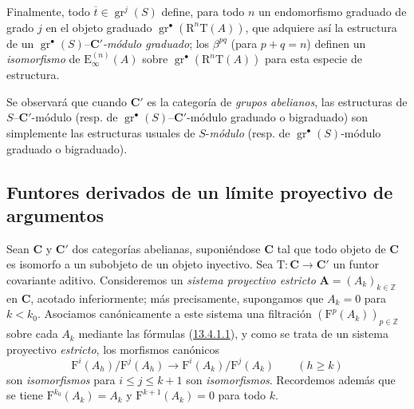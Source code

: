 \begin{env}[13.6.6]
Finalmente, todo $\overline t\in\operatorname{gr}^j(S)$ define, para todo
$n$ un endomorfismo graduado de grado $j$ en el objeto graduado $\operatorname{gr}^\bullet(\mathrm R^n\mathrm T(A))$, que adquiere así la
estructura de un
$\operatorname{gr}^\bullet(S)$--\emph{$\boldsymbol{C}'$-módulo graduado}; los $\beta^{pq}$ (para $p+q=n$) definen un \emph{isomorfismo} de $\mathrm E_\infty^{(n)}(A)$ sobre $\operatorname{gr}^\bullet(\mathrm R^n\mathrm T(A))$ para esta especie de estructura.

Se observará que cuando $\boldsymbol{C}'$ es la categoría de \emph{grupos abelianos}, las
estructuras de $S$--$\boldsymbol{C}'$-módulo (resp. de
$\operatorname{gr}^\bullet(S)$--$\boldsymbol{C}'$-módulo graduado o bigraduado) son
simplemente las estructuras usuales de $S$-\emph{módulo} (resp. de
$\operatorname{gr}^\bullet(S)$-módulo graduado o bigraduado).
\end{env}

\subsection{Funtores derivados de un límite proyectivo de argumentos}
\label{subsection:0.13.7}
\label{subsection:0.13.7-fr}
\label{0.13.7}

\begin{env}[13.7.1]
\label{0.13.7.1}
\label{0.13.7.1-fr}
Sean $\boldsymbol{C}$ y $\boldsymbol{C}'$ dos categorías abelianas, suponiéndose $\boldsymbol{C}$ tal que todo objeto de $\boldsymbol{C}$ es isomorfo a un subobjeto de un
objeto inyectivo.
Sea
$\mathrm T:\boldsymbol{C}\to \boldsymbol{C}'$
un funtor covariante aditivo.
Consideremos un \emph{sistema proyectivo estricto}
$\mathbf A=(A_k)_{k\in\mathbb Z}$ en $\boldsymbol{C}$, acotado inferiormente; más
precisamente, supongamos que $A_k=0$ para $k<k_0$. Asociamos canónicamente a este sistema una filtración $(\mathrm F^p(A_k))_{p\in\mathbb Z}$ sobre cada $A_k$ mediante las fórmulas (\hyperref[0.13.4.1.1-fr]{13.4.1.1}), y como se trata de un sistema proyectivo \emph{estricto}, los morfismos canónicos
\begin{equation}
\label{0.13.7.1.1-fr}
\tag{13.7.1.1}
\mathrm F^i(A_h)/\mathrm F^j(A_h)\to
\mathrm F^i(A_k)/\mathrm F^j(A_k)\qquad(h\geq k)
\end{equation}
son \emph{isomorfismos} para $i\leq j\leq k+1$ son \emph{isomorfismos}. Recordemos además que se tiene $\mathrm F^{k_0}(A_k)=A_k$ y
$\mathrm F^{k+1}(A_k)=0$ para todo $k$.
\end{env}

